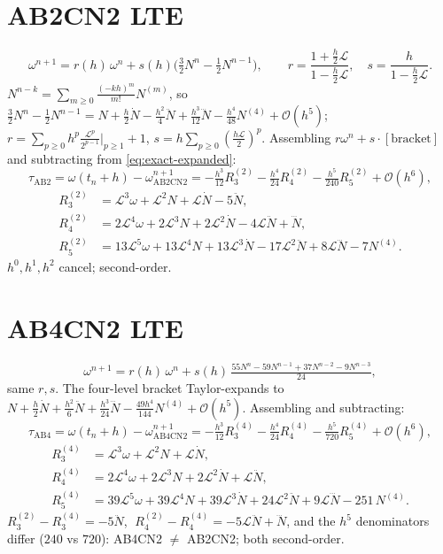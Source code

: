 \documentclass[11pt]{article}
\newcommand{\Lop}{\mathcal{L}}
\newcommand{\Ndot}{\dot{N}}
\newcommand{\Nddot}{\ddot{N}}
\newcommand{\Ndddot}{\dddot{N}}
\newcommand{\bO}{\mathcal{O}}
\begin{document}
\section{AB2CN2 LTE}
\begin{equation}
  \omega^{n+1} = r(h)\,\omega^n + s(h)\bigl(\tfrac{3}{2}N^n-\tfrac{1}{2}N^{n-1}\bigr),
  \qquad
  r=\frac{1+\tfrac{h}{2}\Lop}{1-\tfrac{h}{2}\Lop},\quad
  s=\frac{h}{1-\tfrac{h}{2}\Lop}.
  \label{eq:ab2cn2}
\end{equation}
$N^{n-k}=\sum_{m\ge0}\tfrac{(-kh)^m}{m!}N^{(m)}$, so
$\tfrac{3}{2}N^n-\tfrac12 N^{n-1}=N+\tfrac{h}{2}\Ndot-\tfrac{h^2}{4}\Nddot+\tfrac{h^3}{12}\Ndddot-\tfrac{h^4}{48}N^{(4)}+\bO(h^5)$;
$r=\sum_{p\ge0}h^p\tfrac{\Lop^p}{2^{p-1}}\!\big|_{p\ge1}\!+1$, $s=h\sum_{p\ge0}(\tfrac{h\Lop}{2})^p$.
Assembling $r\omega^n+s\cdot[\text{bracket}]$ and subtracting from \eqref{eq:exact-expanded}:
\begin{equation}
  \boxed{\;\tau_{\mathrm{AB2}} = \omega(t_n+h)-\omega^{n+1}_{\mathrm{AB2CN2}}
  = -\tfrac{h^3}{12}R_3^{(2)} - \tfrac{h^4}{24}R_4^{(2)} - \tfrac{h^5}{240}R_5^{(2)} + \bO(h^6),\;}
  \label{eq:ab2cn2-lte}
\end{equation}
\begin{align}
  R_3^{(2)} &= \Lop^3\omega + \Lop^2 N + \Lop\Ndot - 5\Nddot,\\
  R_4^{(2)} &= 2\Lop^4\omega + 2\Lop^3 N + 2\Lop^2\Ndot - 4\Lop\Nddot + \Ndddot,\\
  R_5^{(2)} &= 13\Lop^5\omega + 13\Lop^4 N + 13\Lop^3\Ndot - 17\Lop^2\Nddot + 8\Lop\Ndddot - 7N^{(4)}.
\end{align}
$h^0,h^1,h^2$ cancel; second-order.

\section{AB4CN2 LTE}
\begin{equation}
  \omega^{n+1} = r(h)\,\omega^n
    + s(h)\,\tfrac{55N^n - 59N^{n-1} + 37N^{n-2} - 9N^{n-3}}{24},
  \label{eq:ab4cn2}
\end{equation}
same $r,s$. The four-level bracket Taylor-expands to
$N+\tfrac{h}{2}\Ndot+\tfrac{h^2}{6}\Nddot+\tfrac{h^3}{24}\Ndddot-\tfrac{49h^4}{144}N^{(4)}+\bO(h^5)$.
Assembling and subtracting:
\begin{equation}
  \boxed{\;\tau_{\mathrm{AB4}} = \omega(t_n+h)-\omega^{n+1}_{\mathrm{AB4CN2}}
  = -\tfrac{h^3}{12}R_3^{(4)} - \tfrac{h^4}{24}R_4^{(4)} - \tfrac{h^5}{720}R_5^{(4)} + \bO(h^6),\;}
  \label{eq:ab4cn2-lte}
\end{equation}
\begin{align}
  R_3^{(4)} &= \Lop^3\omega + \Lop^2 N + \Lop\Ndot,\\
  R_4^{(4)} &= 2\Lop^4\omega + 2\Lop^3 N + 2\Lop^2\Ndot + \Lop\Nddot,\\
  R_5^{(4)} &= 39\Lop^5\omega + 39\Lop^4 N + 39\Lop^3\Ndot + 24\Lop^2\Nddot + 9\Lop\Ndddot - 251\,N^{(4)}.
\end{align}
$R_3^{(2)}-R_3^{(4)} = -5\Nddot$, $\;R_4^{(2)}-R_4^{(4)} = -5\Lop\Nddot+\Ndddot$, and the $h^5$
denominators differ ($240$ vs $720$): AB4CN2 $\ne$ AB2CN2; both second-order.
\end{document}
